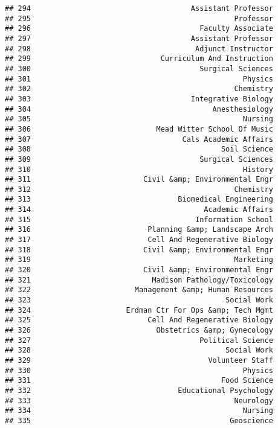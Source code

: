 \documentclass[
]{article}
\begin{document}
\begin{verbatim}
## 294                                     Assistant Professor
## 295                                               Professor
## 296                                       Faculty Associate
## 297                                     Assistant Professor
## 298                                      Adjunct Instructor
## 299                              Curriculum And Instruction
## 300                                       Surgical Sciences
## 301                                                 Physics
## 302                                               Chemistry
## 303                                     Integrative Biology
## 304                                          Anesthesiology
## 305                                                 Nursing
## 306                             Mead Witter School Of Music
## 307                                   Cals Academic Affairs
## 308                                            Soil Science
## 309                                       Surgical Sciences
## 310                                                 History
## 311                          Civil &amp; Environmental Engr
## 312                                               Chemistry
## 313                                  Biomedical Engineering
## 314                                        Academic Affairs
## 315                                      Information School
## 316                           Planning &amp; Landscape Arch
## 317                           Cell And Regenerative Biology
## 318                          Civil &amp; Environmental Engr
## 319                                               Marketing
## 320                          Civil &amp; Environmental Engr
## 321                            Madison Pathology/Toxicology
## 322                        Management &amp; Human Resources
## 323                                             Social Work
## 324                      Erdman Ctr For Ops &amp; Tech Mgmt
## 325                           Cell And Regenerative Biology
## 326                             Obstetrics &amp; Gynecology
## 327                                       Political Science
## 328                                             Social Work
## 329                                         Volunteer Staff
## 330                                                 Physics
## 331                                            Food Science
## 332                                  Educational Psychology
## 333                                               Neurology
## 334                                                 Nursing
## 335                                              Geoscience

\end{verbatim}
\end{document}
